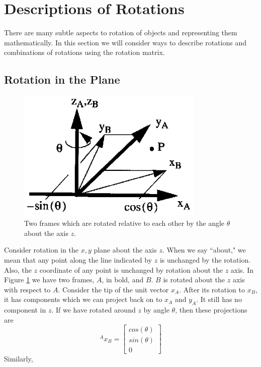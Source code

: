 \section{Descriptions of Rotations}
There are many subtle aspects to rotation of objects and representing them mathematically.  In this section we will consider ways to describe rotations and combinations of rotations using the rotation matrix.


\subsection{Rotation in the Plane}

\begin{figure}
\includegraphics[width=3.5in]{figs02/00323.eps}
\caption{Two frames which are rotated relative to each other by the angle $\theta$ about the axis $z$.}\label{PlanarRotationFrames}
\end{figure}


Consider rotation in the $x,y$ plane about the axis $z$.  When we say ``about," we mean that any point along the line indicated by $z$ is unchanged by the rotation.  Also, the $z$ coordinate of any point is unchanged by rotation about the $z$ axis.  In Figure \ref{PlanarRotationFrames} we have two frames, $A$, in bold, and $B$.   $B$ is rotated about the $z$ axis with respect to $A$.   Consider the tip of the unit vector $x_A$.  After its rotation to $x_B$, it has components which we can project back on to $x_A$ and $y_A$.   It still has no component in $z$.   If we have rotated around $z$ by angle $\theta$, then these projections are
\[
^Ax_B = \left [ \begin{array}{c}   cos(\theta) \\ sin(\theta) \\ 0 \end{array} \right ]
\]
Similarly,

